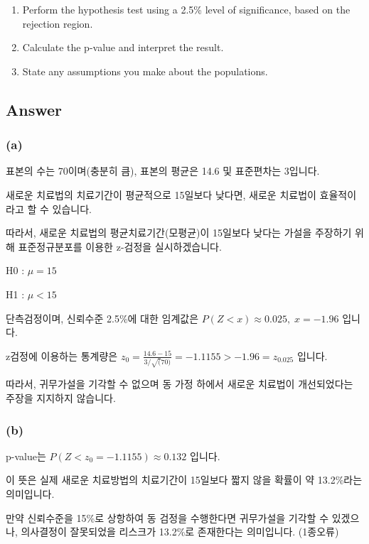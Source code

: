 \documentclass[
  a4paper,
  DIV=11,
  numbers=noendperiod]{scrreprt}
\begin{document}
\begin{enumerate}
\def\labelenumi{(\alph{enumi})}
\item
  Perform the hypothesis test using a 2.5\% level of significance, based
  on the rejection region.
\item
  Calculate the p-value and interpret the result.
\item
  State any assumptions you make about the populations.
\end{enumerate}

\subsection*{Answer}\label{answer-28}

\subsubsection*{(a)}\label{a-2}

표본의 수는 70이며(충분히 큼), 표본의 평균은 14.6 및 표준편차는 3입니다.

새로운 치료법의 치료기간이 평균적으로 15일보다 낮다면, 새로운 치료법이
효율적이라고 할 수 있습니다.

따라서, 새로운 치료법의 평균치료기간(모평균)이 15일보다 낮다는 가설을
주장하기 위해 표준정규분포를 이용한 z-검정을 실시하겠습니다.

H0 : \(\mu=15\)

H1 : \(\mu<15\)

단측검정이며, 신뢰수준 2.5\%에 대한 임계값은
\(P(Z<x)\approx 0.025,\;x=-1.96\) 입니다.

z검정에 이용하는 통계량은
\(z_0=\frac{14.6-15}{3/\sqrt(70)}=-1.1155>-1.96=z_{0.025}\) 입니다.

따라서, 귀무가설을 기각할 수 없으며 동 가정 하에서 새로운 치료법이
개선되었다는 주장을 지지하지 않습니다.

\subsubsection*{(b)}\label{b-2}

p-value는 \(P(Z<z_0=-1.1155)\approx 0.132\) 입니다.

이 뜻은 실제 새로운 치료방법의 치료기간이 15일보다 짧지 않을 확률이 약
13.2\%라는 의미입니다.

만약 신뢰수준을 15\%로 상항하여 동 검정을 수행한다면 귀무가설을 기각할
수 있겠으나, 의사결정이 잘못되었을 리스크가 13.2\%로 존재한다는
의미입니다. (1종오류)
\end{document}
